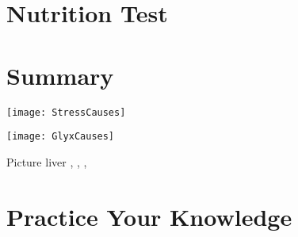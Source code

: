 \documentclass[../main.tex]{subfiles}
\begin{document}


\chapter{Nutrition Test}



\chapter{Summary}

\texttt{[image: StressCauses]}

\texttt{[image: GlyxCauses]}

Picture liver \cite{LiverPic}, \cite{MusclePic}, \cite{BloodPic}, \cite{PancreasPic}

\chapter{Practice Your Knowledge}








\end{document}
